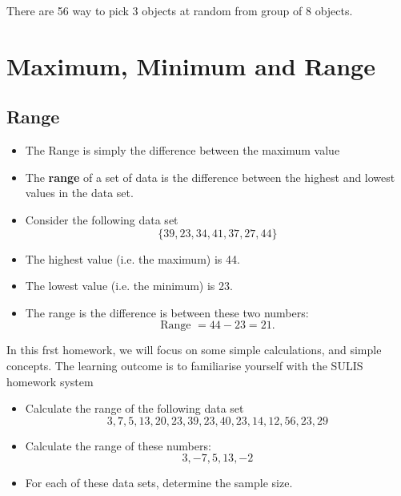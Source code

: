 \documentclass[]{report}
\begin{document}
{There are 56 way to pick 3 objects at random from group of 8 objects.

	
		
		

\section{Maximum, Minimum and Range}

\subsection{Range}
\begin{itemize}
\item The Range is simply the difference between the maximum value
\end{itemize}

\begin{framed}
	\begin{itemize}
		\item The \textbf{range} of a set of data is the difference between the highest and lowest values in the data set.
		\item Consider the following data set
		\[  \{ 	 39,  23,  34,  41,  37,  27,  44 \}\]
		\item The highest value (i.e. the maximum) is 44.
		\item The lowest value (i.e. the minimum) is 23.
		\item The range is the difference is between these two numbers: 
		\[ \mbox{Range } = 44 - 23 = 21. \] 
	\end{itemize}
\end{framed}









In this frst homework, we will focus on some simple calculations, and simple concepts. The learning outcome is to familiarise yourself with the SULIS homework system

\begin{itemize}
	\item Calculate the range of the following data set
	\[3, 7, 5, 13, 20, 23, 39, 23, 40, 23, 14, 12, 56, 23, 29\]
	\item Calculate the range of these numbers:
	\[3, -7, 5, 13, -2\]
	\item For each of these data sets, determine the sample size.
\end{itemize}



}
\end{document}
